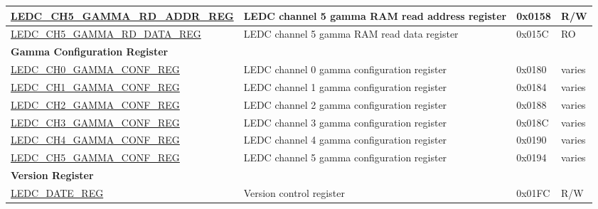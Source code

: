 \begin{longtable}{ | m{6cm} | p{6.7cm} | p{1.3cm} | p{1.5cm} | }
\hyperref[regdesc:LEDCCHNGAMMARDADDRREG]{LEDC\_CH5\_GAMMA\_RD\_ADDR\_REG} & LEDC channel 5 gamma RAM read address register & 0x0158 & R/W \\ \hline
\hyperref[regdesc:LEDCCHNGAMMARDDATAREG]{LEDC\_CH5\_GAMMA\_RD\_DATA\_REG} & LEDC channel 5 gamma RAM read data register & 0x015C & RO \\ \hline
\multicolumn{4}{|l|}{\textbf{Gamma Configuration Register}} \\ \hline
\hyperref[regdesc:LEDCCHNGAMMACONFREG]{LEDC\_CH0\_GAMMA\_CONF\_REG} & LEDC channel 0 gamma configuration register & 0x0180 & varies \\ \hline
\hyperref[regdesc:LEDCCHNGAMMACONFREG]{LEDC\_CH1\_GAMMA\_CONF\_REG} & LEDC channel 1 gamma configuration register & 0x0184 & varies \\ \hline
\hyperref[regdesc:LEDCCHNGAMMACONFREG]{LEDC\_CH2\_GAMMA\_CONF\_REG} & LEDC channel 2 gamma configuration register & 0x0188 & varies \\ \hline
\hyperref[regdesc:LEDCCHNGAMMACONFREG]{LEDC\_CH3\_GAMMA\_CONF\_REG} & LEDC channel 3 gamma configuration register & 0x018C & varies \\ \hline
\hyperref[regdesc:LEDCCHNGAMMACONFREG]{LEDC\_CH4\_GAMMA\_CONF\_REG} & LEDC channel 4 gamma configuration register & 0x0190 & varies \\ \hline
\hyperref[regdesc:LEDCCHNGAMMACONFREG]{LEDC\_CH5\_GAMMA\_CONF\_REG} & LEDC channel 5 gamma configuration register & 0x0194 & varies \\ \hline
\multicolumn{4}{|l|}{\textbf{Version Register}} \\ \hline
\hyperref[regdesc:LEDCDATEREG]{LEDC\_DATE\_REG} & Version control register & 0x01FC & R/W \\ \hline
\end{longtable}
